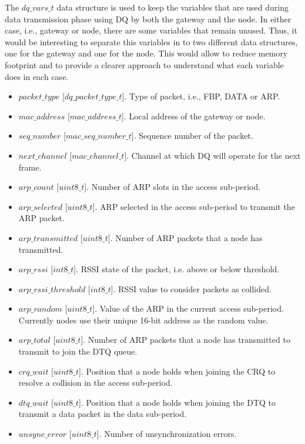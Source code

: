 The $dq\_vars\_t$ data structure is used to keep the variables that are used during data transmission phase using DQ by both the gateway and the node. In either case, i.e., gateway or node, there are some variables that remain unused. Thus, it would be interesting to separate this variables in to two different data structures, one for the gateway and one for the node. This would allow to reduce memory footprint and to provide a clearer approach to understand what each variable does in each case.
\begin{itemize}
\item $packet\_type$ [$dq\_packet\_type\_t$]. Type of packet, i.e., FBP, DATA or ARP.
\item $mac\_address$ [$mac\_address\_t$]. Local address of the gateway or node.
\item $seq\_number$ [$mac\_seq\_number\_t$]. Sequence number of the packet.
\item $next\_channel$ [$mac\_channel\_t$].  Channel at which DQ will operate for the next frame.

\item $arp\_count$ [$uint8\_t$]. Number of ARP slots in the access sub-period.
\item $arp\_selected$ [$uint8\_t$]. ARP selected in the access sub-period to transmit the ARP packet.
\item $arp\_transmitted$ [$uint8\_t$]. Number of ARP packets that a node has transmitted. 

\item $arp\_rssi$ [$int8\_t$]. RSSI state of the packet, i.e. above or below threshold.
\item $arp\_rssi\_threshold$ [$int8\_t$]. RSSI value to consider packets as collided.
\item $arp\_random$ [$uint8\_t$]. Value of the ARP in the current access sub-period. Currently nodes use their unique 16-bit address as the random value.

\item $arp\_total$ [$uint8\_t$]. Number of ARP packets that a node has transmitted to transmit to join the DTQ queue.
\item $crq\_wait$ [$uint8\_t$]. Position that a node holds when joining the CRQ to resolve a collision in the access sub-period.
\item $dtq\_wait$ [$uint8\_t$]. Position that a node holds when joining the DTQ to transmit a data packet in the data sub-period.

\item $unsync\_error$ [$uint8\_t$]. Number of unsynchronization errors.


\end{itemize}
